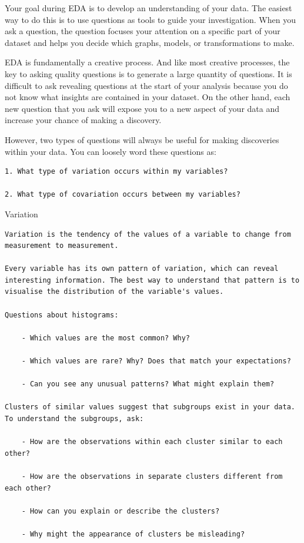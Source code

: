 \documentclass[
]{book}
\begin{document}
Your goal during EDA is to develop an understanding of your data. The easiest way to do this is to use questions as tools to guide your investigation. When you ask a question, the question focuses your attention on a specific part of your dataset and helps you decide which graphs, models, or transformations to make.

EDA is fundamentally a creative process. And like most creative processes, the key to asking quality questions is to generate a large quantity of questions. It is difficult to ask revealing questions at the start of your analysis because you do not know what insights are contained in your dataset. On the other hand, each new question that you ask will expose you to a new aspect of your data and increase your chance of making a discovery.

However, two types of questions will always be useful for making discoveries within your data. You can loosely word these questions as:

\begin{verbatim}
1. What type of variation occurs within my variables?

2. What type of covariation occurs between my variables?
\end{verbatim}

Variation

\begin{verbatim}
Variation is the tendency of the values of a variable to change from measurement to measurement.

Every variable has its own pattern of variation, which can reveal interesting information. The best way to understand that pattern is to visualise the distribution of the variable's values.

Questions about histograms:

    - Which values are the most common? Why?

    - Which values are rare? Why? Does that match your expectations?

    - Can you see any unusual patterns? What might explain them?

Clusters of similar values suggest that subgroups exist in your data. To understand the subgroups, ask:

    - How are the observations within each cluster similar to each other?

    - How are the observations in separate clusters different from each other?

    - How can you explain or describe the clusters?

    - Why might the appearance of clusters be misleading?
\end{verbatim}
\end{document}
